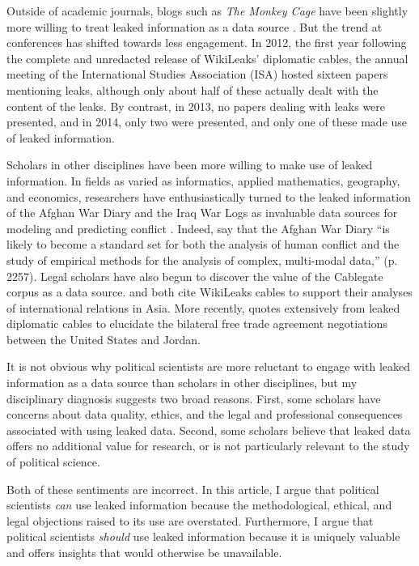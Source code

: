 \documentclass[12pt]{article}
\begin{document}
Outside of academic journals, blogs such as \textit{The Monkey Cage} have been slightly more willing 
to treat leaked information as a data source \citep{voeten2010wikileaks,michael2013united}.
But the trend at conferences has shifted towards less engagement. In 2012, the first year following the 
complete and unredacted release of WikiLeaks' diplomatic cables, the annual meeting of the International Studies 
Association (ISA) hosted sixteen papers mentioning leaks, although only about half of these actually dealt 
with the content of the leaks. By contrast, in 2013, no papers dealing with leaks were presented, and in 2014, 
only two were presented, and only one of these made use of leaked information.

Scholars in other disciplines have been more willing to make use of leaked information. 
In fields as varied as informatics, applied mathematics, geography, and economics, researchers have 
enthusiastically turned to the leaked information of the Afghan War Diary and the Iraq War Logs 
as invaluable data sources for modeling and predicting conflict \citep{oloughlin2010peering,linke2012space-time,zammit-mangion2012point,cseke2013sparse,rusch2013model,
zammit-mangion2013modeling}.
Indeed, \citet{dedeo2013bootstrap} say that the Afghan War Diary ``is likely to become 
a standard set for both the analysis of human conflict and the study of empirical methods for the 
analysis of complex, multi-modal data,'' (p. 2257). Legal scholars have also begun to discover 
the value of the Cablegate corpus as a data source. \citet{khoo2011what} and \citet{mendis2012destiny} 
both cite WikiLeaks cables to support their analyses of international relations in Asia. 
More recently, \citet{el_said2012morning} quotes extensively from 
leaked diplomatic cables to elucidate the bilateral free trade agreement negotiations between the United States 
and Jordan. 

It is not obvious why political scientists are more reluctant to engage with 
leaked information as a data source than scholars in other disciplines, but my disciplinary 
diagnosis suggests two broad reasons. First, some scholars have concerns about data quality, 
ethics, and the legal and professional consequences associated with using leaked data. 
Second, some scholars believe that leaked data offers no additional value for research, 
or is not particularly relevant to the study of political science.

Both of these sentiments are incorrect. 
In this article, I argue that political scientists \emph{can} use leaked information because 
the methodological, ethical, and legal objections raised to its use are overstated. 
Furthermore, I argue that political scientists \emph{should} use leaked information because it 
is uniquely valuable and offers insights that would otherwise be unavailable.
\end{document}
